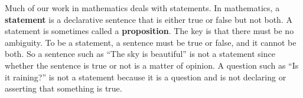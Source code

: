 Much of our work in mathematics deals with statements.  In mathematics, a \textbf{statement}
\label{D:prop}%
%
  is a declarative sentence that is either true or false but not both.    
A statement is sometimes called a \textbf{proposition}.
%
The key is that there must be no ambiguity.  To be a statement, a sentence must be  true or false, and it cannot be both.  So a sentence such as ``The sky is beautiful'' is not a statement since whether the sentence is true or not is a matter of opinion.  A question such as ``Is it raining?'' is not a statement because it is a question and is not declaring or asserting that something is true.


